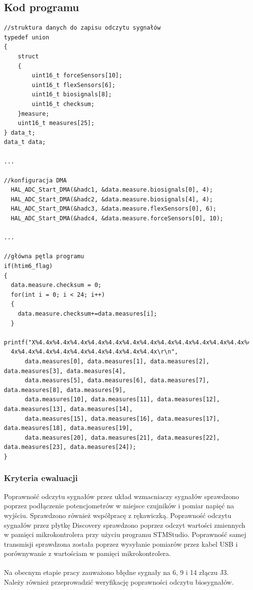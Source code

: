 \documentclass{article}
\begin{document}
\subsection{Kod programu}
\begin{verbatim}
//struktura danych do zapisu odczytu sygnałów
typedef union
{
	struct
	{
		uint16_t forceSensors[10];
		uint16_t flexSensors[6];
		uint16_t biosignals[8];
		uint16_t checksum;
	}measure;
	uint16_t measures[25];
} data_t;
data_t data;

...

//konfiguracja DMA
  HAL_ADC_Start_DMA(&hadc1, &data.measure.biosignals[0], 4);
  HAL_ADC_Start_DMA(&hadc2, &data.measure.biosignals[4], 4);
  HAL_ADC_Start_DMA(&hadc3, &data.measure.flexSensors[0], 6);
  HAL_ADC_Start_DMA(&hadc4, &data.measure.forceSensors[0], 10);

...

//główna pętla programu
if(htim6_flag)
{
  data.measure.checksum = 0;
  for(int i = 0; i < 24; i++)
  {
    data.measure.checksum+=data.measures[i];
  }
  printf("X%4.4x%4.4x%4.4x%4.4x%4.4x%4.4x%4.4x%4.4x%4.4x%4.4x%4.4x%4.4x%4.4x%4.4x%4.4x%4.4x%4.
  4x%4.4x%4.4x%4.4x%4.4x%4.4x%4.4x%4.4x%4.4x\r\n",
	  data.measures[0], data.measures[1], data.measures[2], data.measures[3], data.measures[4],
	  data.measures[5], data.measures[6], data.measures[7], data.measures[8], data.measures[9],
	  data.measures[10], data.measures[11], data.measures[12], data.measures[13], data.measures[14],
	  data.measures[15], data.measures[16], data.measures[17], data.measures[18], data.measures[19],
	  data.measures[20], data.measures[21], data.measures[22], data.measures[23], data.measures[24]);
}
\end{verbatim}

\subsubsection{Kryteria ewaluacji}
Poprawność odczytu sygnałów przez układ wzmacniaczy sygnałów sprawdzono poprzez podłączenie potencjometrów w miejsce czujników i pomiar napięć na wyjściu. Sprawdzono również współpracę z rękawiczką. 
Poprawność odczytu sygnałów przez płytkę Discovery sprawdzono poprzez odczyt wartości zmiennych w pamięci mikrokontrolera przy użyciu programu STMStudio.
Poprawność samej transmisji sprawdzona została poprzez wysyłanie pomiarów przez kabel USB i porównywanie z wartościam w pamięci mikrokontrolera.\\
\\
Na obecnym etapie pracy zauważono błędne sygnały na 6, 9 i 14 złączu J3.\\
Należy również przeprowadzić weryfikację poprawności odczytu biosygnałów.
\end{document}
